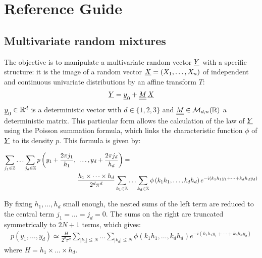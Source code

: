 



\section{Reference Guide}

\subsection{Multivariate random mixtures}

The objective is to manipulate a multivariate random vector ${\underline{Y}}$ with a specific structure:
it is the image of a random vector ${\underline{X}} = (X_1, \hdots, X_n) $ of independent and continuous univariate distributions by an affine transform $T$:
\begin{align}\label{defY}
  {\underline{Y}}={\underline{y}}_0+{\underline{\underline{M}}}\,{\underline{X}}
\end{align}
${\underline{y}}_0\in\mathbb{R}^d$ is a deterministic vector with $d\in\{1,2,3\}$ and ${\underline{\underline{M}}}\in\mathcal{M}_{d,n}(\mathbb{R})$
a deterministic matrix. This particular form allows the calculation of the law of ${\underline{Y}} $ using the Poisson summation formula, which links the characteristic
function $\phi $ of ${\underline{Y}}$ to its density $p$. This formula is given by:

\begin{align}\label{poissonND}
  \sum_{j_1\in\mathbb{Z}}\hdots\sum_{j_d\in\mathbb{Z}} p\left(y_1+\frac{2\pi j_1}{h_1},\right.&\left.\hdots,y_d+\frac{2\pi j_d}{h_d}\right)=\notag\\
    &\frac{h_1\times\cdots\times h_d}{2^d\pi^d}\sum_{k_1\in\mathbb{Z}}\hdots\sum_{k_d\in\mathbb{Z}}\phi\left(k_1h_1,\hdots,k_dh_d\right)e^{-i(k_1h_1y_1+\cdots+k_dh_dy_d)}
\end{align}

By fixing $h_1,\hdots,h_d$ small enough, the nested sums of the left term are reduced to the central term $j_1=\hdots=j_d = 0$.
The sums on the right are truncated symmetrically to $ 2N +1 $ terms, which gives:
\begin{align}
  p\left(y_1,\hdots,y_d\right)\simeq\frac{H}{2^d\pi^d}\sum_{|k_1|\leq N}\hdots\sum_{|k_d|\leq N}\phi\left(k_1h_1,\hdots,k_dh_d\right)e^{-i(k_1h_1y_1+\cdots+k_dh_dy_d)}
\end{align}
where $H = h_1\times\hdots\times h_d$.

